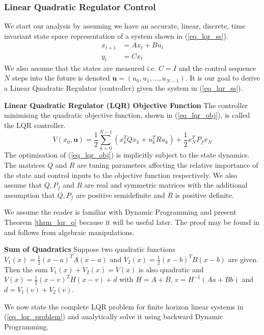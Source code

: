 \subsubsection{Linear Quadratic Regulator Control}
\label{sec_lqr_lit}
We start our analysis by assuming we have an accurate, linear, discrete, time invariant state space representation of a system shown in (\ref{eq_lqr_ss}).
\begin{equation}
\begin{aligned}
x_{t+1} &= Ax_t+ Bu_t \\
y_t &= Cx_t
\end{aligned}
\label{eq_lqr_ss}
\end{equation}
We also assume that the states are measured i.e. $C=I$ and the control sequence $N$ steps into the future is denoted $\mathbf{u}=(u_0, u_1,...,u_{N-1})$. It is our goal to derive a Linear Quadratic Regulator (controller) given the system in (\ref{eq_lqr_ss}).
\begin{defn}
\textbf{Linear Quadratic Regulator (LQR) Objective Function} The controller minimising the quadratic objective function, shown in (\ref{eq_lqr_obj}), is called the LQR controller. 
\begin{equation}
V(x_0, \mathbf{u}) = \frac{1}{2}\sum_{k=0}^{N-1} \left( x_k^TQx_k + u_k^TRu_k \right) + \frac{1}{2}x_N^TP_fx_N
\label{eq_lqr_obj}
\end{equation}
The optimisation of (\ref{eq_lqr_obj}) is implicitly subject to the state dynamics. The matrices $Q$ and $R$ are tuning parameters affecting the relative importance of the state and control inputs to the objective function respectively. We also assume that $Q, P_f$ and $R$ are real and symmetric matrices with the additional assumption that $Q, P_f$ are positive semidefinite and $R$ is positive definite.
\label{def_lqr}
\end{defn}
We assume the reader is familiar with Dynamic Programming and present Theorem \ref{thrm_lqr_q} because it will be useful later. The proof may be found in \cite{raw} and follows from algebraic manipulations.
\begin{thrm}
\textbf{Sum of Quadratics} Suppose two quadratic functions $V_1(x) = \frac{1}{2}(x-a)^TA(x-a)$ and $V_2(x) = \frac{1}{2}(x-b)^TB(x-b)$ are given. Then the sum $V_1(x) + V_2(x) = V(x)$ is also quadratic and $V(x) = \frac{1}{2}(x-v)^TH(x-v)+d$ with $H = A+B$, $v = H^{-1}(Aa+Bb)$ and $d = V_1(v) + V_2(v)$.
\label{thrm_lqr_q}
\end{thrm}
We now state the complete LQR problem for finite horizon linear systems in (\ref{eq_lqr_problem}) and analytically solve it using backward Dynamic Programming. 
